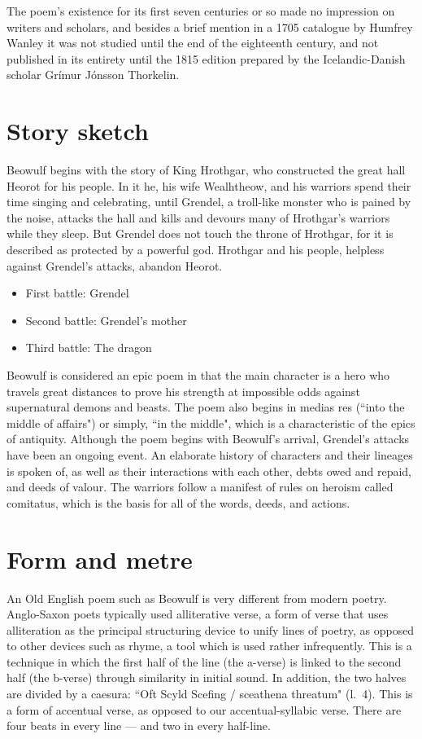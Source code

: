 \documentclass{hrothgar-memo}
\begin{document}
The poem's existence for its first seven centuries or so made no impression on writers and scholars, and besides a brief mention in a 1705 catalogue by Humfrey Wanley it was not studied until the end of the eighteenth century, and not published in its entirety until the 1815 edition prepared by the Icelandic-Danish scholar Gr\'imur J\'onsson Thorkelin.

\section{Story sketch}

Beowulf begins with the story of King Hrothgar, who constructed the great hall Heorot for his people. In it he, his wife Wealhtheow, and his warriors spend their time singing and celebrating, until Grendel, a troll-like monster who is pained by the noise, attacks the hall and kills and devours many of Hrothgar's warriors while they sleep. But Grendel does not touch the throne of Hrothgar, for it is described as protected by a powerful god. Hrothgar and his people, helpless against Grendel's attacks, abandon Heorot.

\begin{itemize}
\setlength{\itemsep}{1pt}
\item First battle: Grendel
\item Second battle: Grendel's mother
\item Third battle: The dragon
\end{itemize}

Beowulf is considered an epic poem in that the main character is a hero who travels great distances to prove his strength at impossible odds against supernatural demons and beasts. The poem also begins in medias res (``into the middle of affairs") or simply, ``in the middle", which is a characteristic of the epics of antiquity. Although the poem begins with Beowulf's arrival, Grendel's attacks have been an ongoing event. An elaborate history of characters and their lineages is spoken of, as well as their interactions with each other, debts owed and repaid, and deeds of valour. The warriors follow a manifest of rules on heroism called comitatus, which is the basis for all of the words, deeds, and actions.

\section{Form and metre}

An Old English poem such as Beowulf is very different from modern poetry. Anglo-Saxon poets typically used alliterative verse, a form of verse that uses alliteration as the principal structuring device to unify lines of poetry, as opposed to other devices such as rhyme, a tool which is used rather infrequently. This is a technique in which the first half of the line (the a-verse) is linked to the second half (the b-verse) through similarity in initial sound. In addition, the two halves are divided by a caesura: ``Oft Scyld Scefing / sceathena threatum" (l.~4). This is a form of accentual verse, as opposed to our accentual-syllabic verse. There are four beats in every line --- and two in every half-line.
\end{document}
